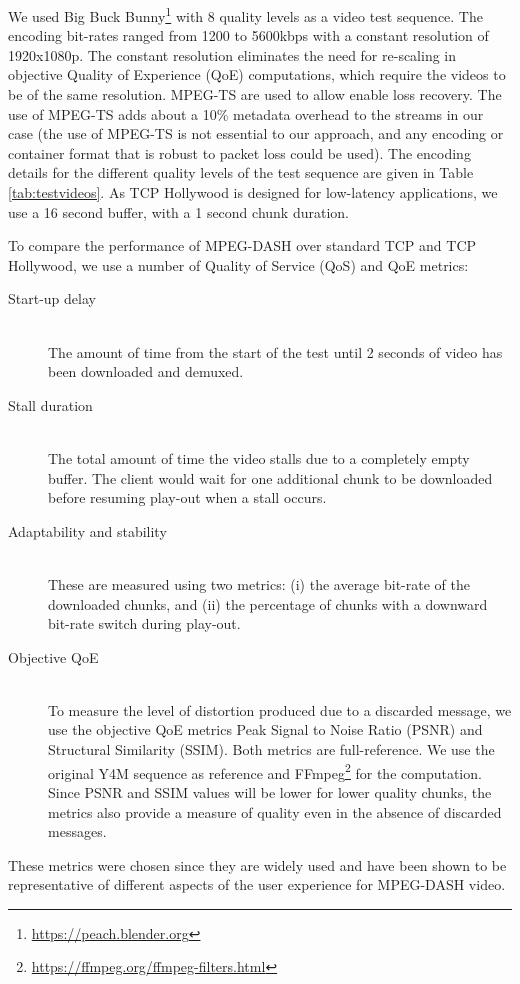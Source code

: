 We used Big Buck Bunny\footnote{\url{https://peach.blender.org}} with 8 quality levels as a video 
test sequence. The encoding bit-rates ranged from 1200 to 5600kbps with a constant resolution of 
1920x1080p. The constant resolution eliminates the need for re-scaling in objective Quality of 
Experience (QoE)
computations, which require the videos to be of the same resolution. MPEG-TS
are used to allow enable loss recovery. The use of MPEG-TS adds about a
10\% metadata overhead to the streams in our case (the use of MPEG-TS is not
essential to our approach, and any encoding or container format that is robust to packet loss
could be used). The encoding details for the different quality levels of
the test sequence are given in Table \ref{tab:testvideos}.
As TCP Hollywood is designed for low-latency applications, we use a 16 second buffer, with
a 1 second chunk duration.

To compare the performance of MPEG-DASH over standard TCP and TCP Hollywood, we use a number of 
Quality of Service (QoS) and QoE metrics: 
\begin{description}
    \item[Start-up delay] \hfill \\
        The amount of time from the start of the test until 2 seconds of video has been downloaded and demuxed.
    \item[Stall duration] \hfill \\
        The total amount of time the video stalls due to a completely empty buffer. The
        client would wait for one additional chunk to be downloaded before resuming play-out
        when a stall occurs.
    \item[Adaptability and stability] \hfill \\
        These are measured using two metrics: (i) the average bit-rate of the downloaded
        chunks, and (ii) the percentage of chunks with a downward bit-rate switch during
        play-out.
    \item[Objective QoE] \hfill \\
        To measure the level of distortion produced due to a discarded message, we use the 
        objective QoE metrics Peak Signal to Noise Ratio (PSNR) and Structural Similarity
        (SSIM). Both metrics are full-reference. We use the original Y4M sequence as
        reference and FFmpeg\footnote{\url{https://ffmpeg.org/ffmpeg-filters.html}} for the
        computation. Since PSNR and SSIM values will be lower for lower quality chunks, the
        metrics also provide a measure of quality even in the absence of discarded messages.
\end{description}

These metrics were chosen since they are widely used and have been shown to
be representative of different aspects of the user experience for MPEG-DASH
video.
